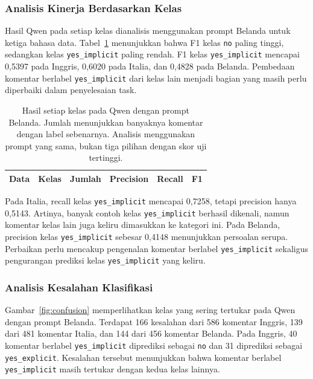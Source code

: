 \documentclass[11pt]{article}
\begin{document}
\subsubsection{Analisis Kinerja Berdasarkan Kelas}
Hasil Qwen pada setiap kelas dianalisis menggunakan prompt Belanda untuk ketiga bahasa data. Tabel~\ref{tab:classes} menunjukkan bahwa F1 kelas \texttt{no} paling tinggi, sedangkan kelas \texttt{yes\_implicit} paling rendah. F1 kelas \texttt{yes\_implicit} mencapai 0,5397 pada Inggris, 0,6020 pada Italia, dan 0,4828 pada Belanda. Pembedaan komentar berlabel \texttt{yes\_implicit} dari kelas lain menjadi bagian yang masih perlu diperbaiki dalam penyelesaian task.

\begin{table}[t]
\centering
\begin{tabular}{llrrrr}
\toprule
Data & Kelas & Jumlah & Precision & Recall & F1 \\
\midrule

\end{tabular}
\caption{Hasil setiap kelas pada Qwen dengan prompt Belanda. Jumlah menunjukkan banyaknya komentar dengan label sebenarnya. Analisis menggunakan prompt yang sama, bukan tiga pilihan dengan skor uji tertinggi.}
\label{tab:classes}
\end{table}

Pada Italia, recall kelas \texttt{yes\_implicit} mencapai 0,7258, tetapi precision hanya 0,5143. Artinya, banyak contoh kelas \texttt{yes\_implicit} berhasil dikenali, namun komentar kelas lain juga keliru dimasukkan ke kategori ini. Pada Belanda, precision kelas \texttt{yes\_implicit} sebesar 0,4148 menunjukkan persoalan serupa. Perbaikan perlu mencakup pengenalan komentar berlabel \texttt{yes\_implicit} sekaligus pengurangan prediksi kelas \texttt{yes\_implicit} yang keliru.

\subsubsection{Analisis Kesalahan Klasifikasi}
Gambar~\ref{fig:confusion} memperlihatkan kelas yang sering tertukar pada Qwen dengan prompt Belanda. Terdapat 166 kesalahan dari 586 komentar Inggris, 139 dari 481 komentar Italia, dan 144 dari 456 komentar Belanda. Pada Inggris, 40 komentar berlabel \texttt{yes\_implicit} diprediksi sebagai \texttt{no} dan 31 diprediksi sebagai \texttt{yes\_explicit}. Kesalahan tersebut menunjukkan bahwa komentar berlabel \texttt{yes\_implicit} masih tertukar dengan kedua kelas lainnya.
\end{document}

